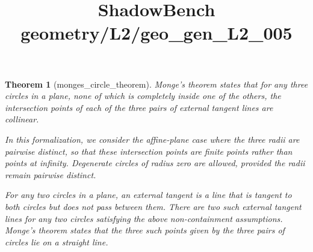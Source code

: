 \documentclass{article}
\title{ShadowBench geometry/L2/geo\_gen\_L2\_005}
\newtheorem{theorem}{Theorem}
\begin{document}
\maketitle

\begin{theorem}[monges_circle_theorem]\label{thm:monge}
Monge's theorem states that for any three circles in a plane, none of which is completely inside one of the others, the intersection points of each of the three pairs of external tangent lines are collinear.

In this formalization, we consider the affine-plane case where the three radii are pairwise distinct, so that these intersection points are finite points rather than points at infinity. Degenerate circles of radius zero are allowed, provided the radii remain pairwise distinct.

For any two circles in a plane, an external tangent is a line that is tangent to both circles but does not pass between them. There are two such external tangent lines for any two circles satisfying the above non-containment assumptions. Monge's theorem states that the three such points given by the three pairs of circles lie on a straight line.
\end{theorem}
\end{document}
